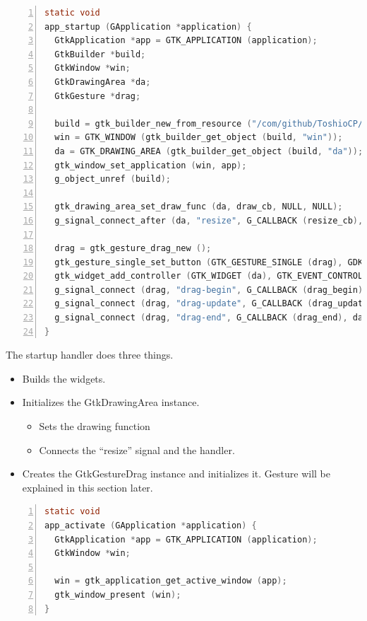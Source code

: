 \begin{lstlisting}[language=C, numbers=left]
static void
app_startup (GApplication *application) {
  GtkApplication *app = GTK_APPLICATION (application);
  GtkBuilder *build;
  GtkWindow *win;
  GtkDrawingArea *da;
  GtkGesture *drag;

  build = gtk_builder_new_from_resource ("/com/github/ToshioCP/rect/rect.ui");
  win = GTK_WINDOW (gtk_builder_get_object (build, "win"));
  da = GTK_DRAWING_AREA (gtk_builder_get_object (build, "da"));
  gtk_window_set_application (win, app);
  g_object_unref (build);

  gtk_drawing_area_set_draw_func (da, draw_cb, NULL, NULL);
  g_signal_connect_after (da, "resize", G_CALLBACK (resize_cb), NULL);

  drag = gtk_gesture_drag_new ();
  gtk_gesture_single_set_button (GTK_GESTURE_SINGLE (drag), GDK_BUTTON_PRIMARY);
  gtk_widget_add_controller (GTK_WIDGET (da), GTK_EVENT_CONTROLLER (drag));
  g_signal_connect (drag, "drag-begin", G_CALLBACK (drag_begin), NULL);
  g_signal_connect (drag, "drag-update", G_CALLBACK (drag_update), da);
  g_signal_connect (drag, "drag-end", G_CALLBACK (drag_end), da);
}
\end{lstlisting}

The startup handler does three things.

\begin{itemize}
\tightlist
\item
  Builds the widgets.
\item
  Initializes the GtkDrawingArea instance.

  \begin{itemize}
  \tightlist
  \item
    Sets the drawing function
  \item
    Connects the ``resize'' signal and the handler.
  \end{itemize}
\item
  Creates the GtkGestureDrag instance and initializes it. Gesture will
  be explained in this section later.
\end{itemize}

\begin{lstlisting}[language=C, numbers=left]
static void
app_activate (GApplication *application) {
  GtkApplication *app = GTK_APPLICATION (application);
  GtkWindow *win;

  win = gtk_application_get_active_window (app);
  gtk_window_present (win);
}
\end{lstlisting}

